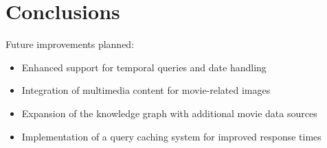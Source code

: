 \documentclass{article}
\begin{document}
\section{Conclusions}

Future improvements planned:

\begin{itemize}
    \item Enhanced support for temporal queries and date handling
    \item Integration of multimedia content for movie-related images
    \item Expansion of the knowledge graph with additional movie data sources
    \item Implementation of a query caching system for improved response times
\end{itemize}




\end{document}
